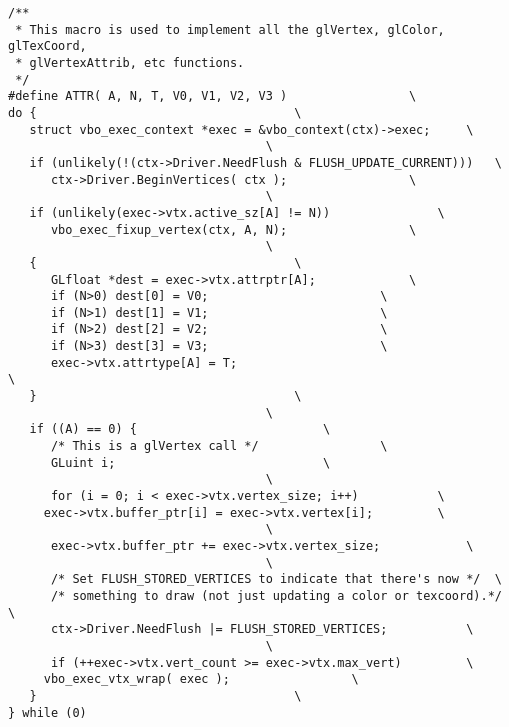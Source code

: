 \begin{lstlisting}
/**
 * This macro is used to implement all the glVertex, glColor, glTexCoord,
 * glVertexAttrib, etc functions.
 */
#define ATTR( A, N, T, V0, V1, V2, V3 )					\
do {									\
   struct vbo_exec_context *exec = &vbo_context(ctx)->exec;		\
									\
   if (unlikely(!(ctx->Driver.NeedFlush & FLUSH_UPDATE_CURRENT)))	\
      ctx->Driver.BeginVertices( ctx );					\
   									\
   if (unlikely(exec->vtx.active_sz[A] != N))				\
      vbo_exec_fixup_vertex(ctx, A, N);					\
   									\
   {									\
      GLfloat *dest = exec->vtx.attrptr[A];				\
      if (N>0) dest[0] = V0;						\
      if (N>1) dest[1] = V1;						\
      if (N>2) dest[2] = V2;						\
      if (N>3) dest[3] = V3;						\
      exec->vtx.attrtype[A] = T;                                        \
   }									\
									\
   if ((A) == 0) {							\
      /* This is a glVertex call */					\
      GLuint i;								\
									\
      for (i = 0; i < exec->vtx.vertex_size; i++)			\
	 exec->vtx.buffer_ptr[i] = exec->vtx.vertex[i];			\
									\
      exec->vtx.buffer_ptr += exec->vtx.vertex_size;			\    
									\
      /* Set FLUSH_STORED_VERTICES to indicate that there's now */	\
      /* something to draw (not just updating a color or texcoord).*/	\
      ctx->Driver.NeedFlush |= FLUSH_STORED_VERTICES;			\
									\
      if (++exec->vtx.vert_count >= exec->vtx.max_vert)			\
	 vbo_exec_vtx_wrap( exec );					\
   }									\
} while (0)
\end{lstlisting}


